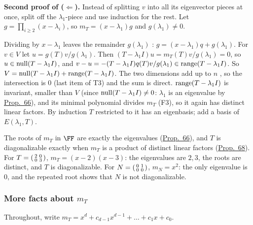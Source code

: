 \documentclass[10pt]{scrartcl}
\begin{document}
\textbf{Second proof of ($\Leftarrow$).} Instead of splitting $v$ into all its eigenvector pieces at once, split off the $\lambda_1$-piece and use induction for the rest. Let $g=\prod_{i\ge2}(x-\lambda_i)$, so $m_T=(x-\lambda_1)g$ and $g(\lambda_1)\ne0$.
\begin{steps}
  \ii Dividing by $x-\lambda_1$ leaves the remainder $g(\lambda_1)$ : $g=(x-\lambda_1)q+g(\lambda_1)$.
  \ii For $v\in V$ let $u=g(T)v/g(\lambda_1)$. Then $(T-\lambda_1I)u=m_T(T)v/g(\lambda_1)=0$, so $u\in\operatorname{null}(T-\lambda_1I)$, and $v-u=-(T-\lambda_1I)q(T)v/g(\lambda_1)\in\operatorname{range}(T-\lambda_1I)$.
  \ii So $V=\operatorname{null}(T-\lambda_1I)+\operatorname{range}(T-\lambda_1I)$. The two dimensions add up to $n$ , so the intersection is $0$ (last item of T3) and the sum is direct.
  \ii $\operatorname{range}(T-\lambda_1I)$ is invariant, smaller than $V$ (since $\operatorname{null}(T-\lambda_1I)\ne0$: $\lambda_1$ is an eigenvalue by \hyperref[prop-66]{Prop.~66}), and its minimal polynomial divides $m_T$ (F3), so it again has distinct linear factors. By induction $T$ restricted to it has an eigenbasis; add a basis of $E(\lambda_1,T)$.
\end{steps}

\revisit The roots of $m_T$ in $\FF$ are exactly the eigenvalues (\hyperref[prop-66]{Prop.~66}), and $T$ is diagonalizable exactly when $m_T$ is a product of distinct linear factors (\hyperref[prop-68]{Prop.~68}). For $T=\begin{psmallmatrix}2&0\\0&3\end{psmallmatrix}$, $m_T=(x-2)(x-3)$: the eigenvalues are $2,3$, the roots are distinct, and $T$ is diagonalizable. For $N=\begin{psmallmatrix}0&1\\0&0\end{psmallmatrix}$, $m_N=x^2$: the only eigenvalue is $0$, and the repeated root shows that $N$ is not diagonalizable.


\subsubsection*{More facts about $m_T$}
Throughout, write $m_T=x^d+c_{d-1}x^{d-1}+\dots+c_1x+c_0$.
\end{document}
